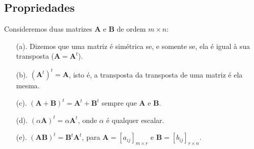 \subsection*{Propriedades}
Consideremos duas matrizes $\textbf{A}$ e  $\textbf{B}$ de ordem $m\times n$: 
\begin{itemize}
	\item[(a).] Dizemos que uma matriz é simétrica se, e somente se, ela é igual à sua transposta ($\textbf{A}=\textbf{A}^{t}$).
	\item[(b).] $(\textbf{A}^{t})^{t}=\textbf{A}$, isto é, a transposta da transposta de uma matriz é ela mesma.
	\item[(c).] $(\textbf{A}+\textbf{B})^{t}=\textbf{A}^{t}+\textbf{B}^{t}$ sempre que $\textbf{A}$ e $\textbf{B}$.
	\item[(d).] $(\alpha \textbf{A})^{t}=\alpha \textbf{A}^{t}$, onde $\alpha$ é qualquer escalar.
	\item[(e).] $(\textbf{A}\textbf{B})^{t}=\textbf{B}^{t}\textbf{A}^{t}$, para $\textbf{A}=[a_{ij}]_{m\times r}$ e $\textbf{B}=[b_{ij}]_{r\times n}$.
\end{itemize}

